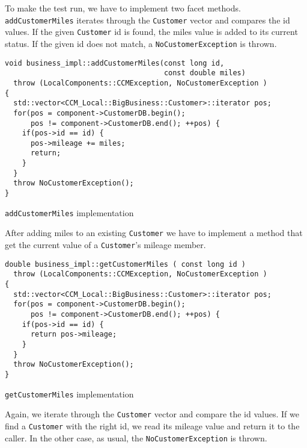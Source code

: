 \newpage
To make the test run, we have to implement two facet methods.
{\tt addCustomerMiles} iterates through the {\tt Customer} vector
and compares the id values.
If the given {\tt Customer} id is found, the miles value is added to
its current status.
If the given id does not match, a {\tt NoCustomerException} is thrown.
\begin{Example}
\begin{minifbox}
\begin{small}
\begin{verbatim}
void business_impl::addCustomerMiles(const long id, 
                                     const double miles)
  throw (LocalComponents::CCMException, NoCustomerException )
{
  std::vector<CCM_Local::BigBusiness::Customer>::iterator pos;
  for(pos = component->CustomerDB.begin(); 
      pos != component->CustomerDB.end(); ++pos) {
    if(pos->id == id) {
      pos->mileage += miles;
      return;
    }
  }
  throw NoCustomerException();    
}
\end{verbatim}
\end{small}
\end{minifbox}
\caption{{\tt addCustomerMiles} implementation}
\label{example:}
\end{Example}


After adding miles to an existing {\tt Customer} we have to implement a method
that get the current value of a {\tt Customer}'s mileage member.

\begin{Example}
\begin{minifbox}
\begin{small}
\begin{verbatim}
double business_impl::getCustomerMiles ( const long id )
  throw (LocalComponents::CCMException, NoCustomerException )
{
  std::vector<CCM_Local::BigBusiness::Customer>::iterator pos;
  for(pos = component->CustomerDB.begin(); 
      pos != component->CustomerDB.end(); ++pos) {
    if(pos->id == id) {
      return pos->mileage;
    }
  }
  throw NoCustomerException(); 
}
\end{verbatim}
\end{small}
\end{minifbox}
\caption{{\tt getCustomerMiles} implementation}
\label{example:}
\end{Example}

Again, we iterate through the {\tt Customer} vector and compare the id values.
If we find a {\tt Customer} with the right id, we read its mileage value and
return it to the caller.
In the other case, as usual, the {\tt NoCustomerException} is thrown.



